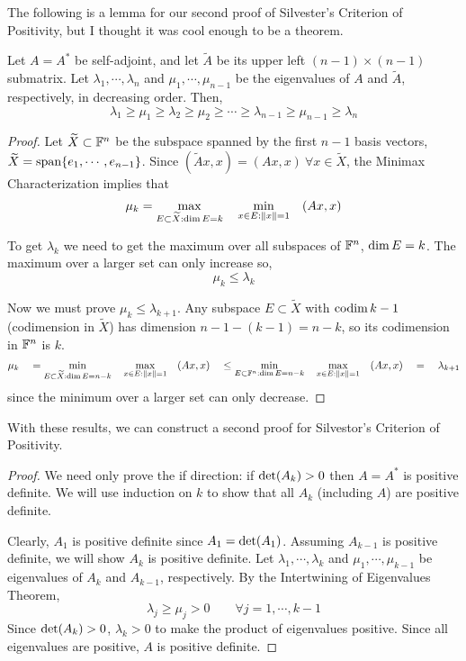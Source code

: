 The following is a lemma for our second proof of Silvester's Criterion of Positivity, but I thought it was cool enough to be a theorem. 

\begin{theorem}
Let $A = A^{*}$ be self-adjoint, and let $\widetilde{A}$ be its upper left $(n-1) \times (n-1)$ submatrix. Let $\lambda_{1}, \cdots, \lambda_{n}$ and $\mu_{1}, \cdots, \mu_{n-1}$ be the eigenvalues of $A$ and $\widetilde{A}$, respectively, in decreasing order. Then, 
$$\lambda_{1} \geq \mu_{1} \geq \lambda_{2} \geq \mu_{2} \geq \cdots \geq \lambda_{n-1} \geq \mu_{n-1} \geq \lambda_{n}$$
\end{theorem}

\begin{proof}
Let $\widetilde{X} \subset \mathbb{F}^{n}$ be the subspace spanned by the first $n-1$ basis vectors, $\widetilde{X} = \operatorname{span} \{e_{1}, \cdots, e_{n-1}\}$. Since $(\widetilde{A}x, x) = (Ax, x) \: \forall x \in \widetilde{X}$, the Minimax Characterization implies that 
$$\mu_{k} = \max_{E \subset \widetilde{X} : \operatorname{dim} E = k} \quad \min_{x \in E : \norm{x} = 1} \quad (Ax, x)$$

To get $\lambda_{k}$ we need to get the maximum over all subspaces of $\mathbb{F}^{n}$, $\operatorname{dim} E = k$. The maximum over a larger set can only increase so,
$$\mu_{k} \leq \lambda_{k}$$

Now we must prove $\mu_{k} \leq \lambda_{k+1}$. Any subspace $E \subset \widetilde{X}$ with $\operatorname{codim} k-1$ (codimension in $\widetilde{X}$) has dimension $n - 1 - (k - 1) = n - k$, so its codimension in $\mathbb{F}^{n}$ is $k$. 
$$\mu_{k} \quad = \min_{E \subset \widetilde{X} : \operatorname{dim} E = n - k} \quad \max_{x \in E : \norm{x} = 1} \quad (Ax, x) \quad \leq \min_{E \subset \mathbb{F}^{n} : \operatorname{dim} E = n - k} \quad \max_{x \in E : \norm{x} =1} \quad (Ax,x) \quad = \quad \lambda_{k+1}$$
since the minimum over a larger set can only decrease.
\end{proof}

With these results, we can construct a second proof for Silvestor's Criterion of Positivity. 

\begin{proof}
We need only prove the if direction: if $\operatorname{det}(A_{k}) > 0$ then $A = A^{*}$ is positive definite. We will use induction on $k$ to show that all $A_{k}$ (including $A$) are positive definite. 

Clearly, $A_{1}$ is positive definite since $A_{1} = \operatorname{det}(A_{1})$. Assuming $A_{k-1}$ is positive definite, we will show $A_{k}$ is positive definite. Let $\lambda_{1}, \cdots, \lambda_{k}$ and $\mu_{1}, \cdots, \mu_{k-1}$ be eigenvalues of $A_{k}$ and $A_{k-1}$, respectively. By the Intertwining of Eigenvalues Theorem, 
$$\lambda_{j} \geq \mu_{j} > 0 \qquad \forall j = 1, \cdots, k-1$$
Since $\operatorname{det}(A_{k}) > 0$, $\lambda_{k} > 0$ to make the product of eigenvalues positive. Since all eigenvalues are positive, $A$ is positive definite. 
\end{proof}